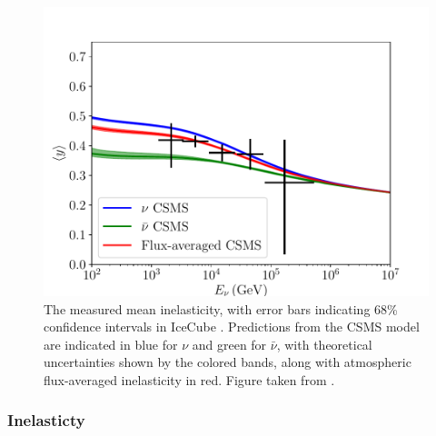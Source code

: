\begin{figure}[h!]
        \includegraphics{./figures/nu_phenomenology/split_fit_inel.pdf}
        \caption[The measured mean inelasticity, along with predictions from CSMS model]{The measured mean inelasticity, with error bars indicating 68\% confidence intervals in IceCube \cite{gary_paper}. Predictions from the CSMS model are indicated in blue for $\nu$ and green for $\bar{\nu}$, with theoretical uncertainties shown by the colored bands, along with atmospheric flux-averaged inelasticity in red. Figure taken from \cite{gary_paper}.}
    \end{figure}

\subsubsection*{Inelasticty}
\label{sec:inelasticity}

